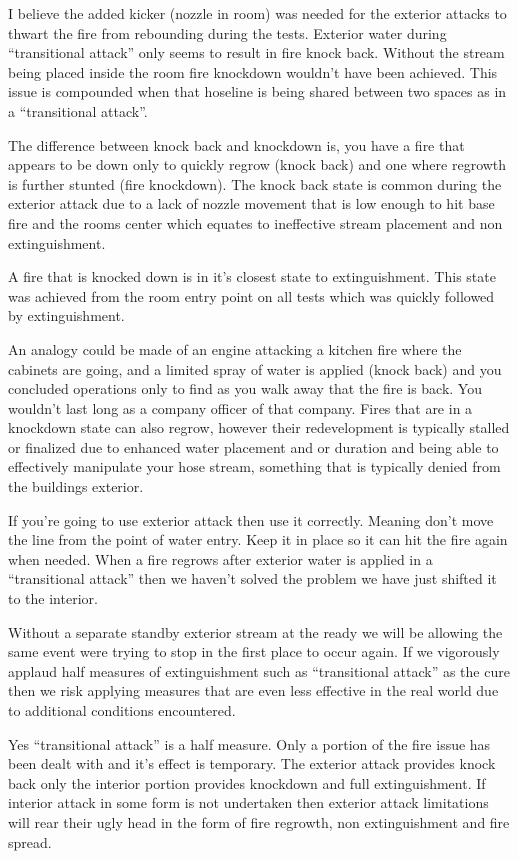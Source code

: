 \documentclass[12pt,oneside]{book}
\begin{document}
\begin{appendix}
I believe the added kicker (nozzle in room) was needed for the exterior attacks to thwart the fire from rebounding during the tests. Exterior water during ``transitional attack'' only seems to result in fire knock back. Without the stream being placed inside the room fire knockdown wouldn't have been achieved. This issue is compounded when that hoseline is being shared between two spaces as in a ``transitional attack''.

The difference between knock back and knockdown is, you have a fire that appears to be down only to quickly regrow (knock back) and one where regrowth is further stunted (fire knockdown). The knock back state is common during the exterior attack due to a lack of nozzle movement that is low enough to hit base fire and the rooms center which equates to ineffective stream placement and non extinguishment.

A fire that is knocked down is in it's closest state to extinguishment. This state was achieved from the room entry point on all tests which was quickly followed by extinguishment. 

An analogy could be made of an engine attacking a kitchen fire where the cabinets are going, and a limited spray of water is applied (knock back) and you concluded operations only to find as you walk away that the fire is back. You wouldn't last long as a company officer of that company. Fires that are in a knockdown state can also regrow, however their redevelopment is typically stalled or finalized due to enhanced water placement and or duration and being able to effectively manipulate your hose stream, something that is typically denied from the buildings exterior.

If you're going to use exterior attack then use it correctly. Meaning don't move the line from the point of water entry. Keep it in place so it can hit the fire again when needed. When a fire regrows after exterior water is applied in a ``transitional attack'' then we haven't solved the problem we have just shifted it to the interior.  

Without a separate standby exterior stream at the ready we will be allowing the same event were trying to stop in the first place to occur again. If we vigorously applaud half measures of extinguishment such as ``transitional attack'' as the cure then we risk applying measures that are even less effective in the real world due to additional conditions encountered. 

Yes ``transitional attack'' is a half measure. Only a portion of the fire issue has been dealt with and it's effect is temporary. The exterior attack provides knock back only the interior portion provides knockdown and full extinguishment. If interior attack in some form is not undertaken then exterior attack limitations will rear their ugly head in the form of fire regrowth, non extinguishment and fire spread.


\end{appendix}
\end{document}
